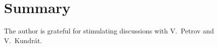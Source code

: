 \documentclass[pdftex,twocolumn,epjc3]{svjour3}
\begin{document}
\section{Summary}
\label{sec:summary}




\begin{acknowledgements}
The author is grateful for stimulating discussions with V.~Petrov and V.~Kundr\'at.
\end{acknowledgements}


\def\journal#1#2#3#4{
	#1 #2 (#3) #4
}
\end{document}

